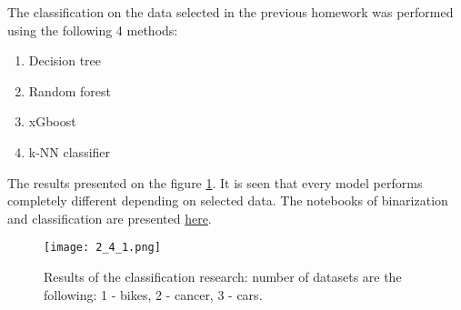 The classification on the data selected in the previous homework was performed using the following 4 methods:

\begin{enumerate}
\item Decision tree
\item Random forest
\item xGboost
\item k-NN classifier
\end{enumerate}

The results presented on the figure \ref{fig:baseline}. 
It is seen that every model performs completely different depending on selected data.
The notebooks of binarization and classification are presented \href{https:/github.com/Chpel/Maga/tree/main/OSDA\%20.ipynb/Big\%20homework}{here}.

\begin{figure}[h]
\centering
\texttt{[image: 2\_4\_1.png]}
\caption{Results of the classification research: number of datasets are the following: 1 - bikes, 2 - cancer, 3 - cars.}
\label{fig:baseline}
\end{figure}

